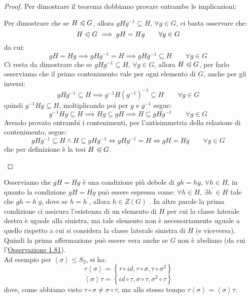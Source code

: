\documentclass[11pt]{scrartcl}
\begin{document}
\begin{proof}
Per dimostrare il teorema dobbiamo provare entrambe le implicazioni:
	\begin{enumerate}[(a)]
	\ii Per dimostrare che se $H \trianglelefteqslant G$, allora $gHg^{-1} \subseteq H$,  $\forall g \in G$, ci basta osservare che:
		\[ H \trianglelefteqslant G
		\implies
		gH=Hg
		\qquad
		\forall g \in G
		\]
da cui:
		\[ gH=Hg
		\implies
		gHg^{-1}=H
		\implies
		gHg^{-1} \subseteq H
		\qquad
		\forall g \in G
		\]
	\ii Ci resta da dimostrare che se $gHg^{-1} \subseteq H$, $\forall g \in G$, allora $H \trianglelefteqslant G$, per farlo osserviamo che il primo contenimento vale per ogni elemento di $G$, anche per gli inversi:
		\[ gHg^{-1} \subseteq H
		\implies
		g^{-1}H(g^{-1})^{-1} \subseteq H
		\qquad
		\forall g \in G
		\]
quindi $g^{-1}Hg \subseteq H$, moltiplicando poi per $g$ e $g^{-1}$ segue:
		\[ g^{-1}Hg  \subseteq H
		\implies
		Hg  \subseteq gH
		\implies
		H  \subseteq gHg^{-1}
		\qquad
		\forall g \in G
		\]
Avendo provato entrambi i contenimenti, per l'antisimmetria della relazione di contenimento, segue:
		\[ gHg^{-1} \subseteq H \land H  \subseteq gHg^{-1}
		\iff
		gHg^{-1} = H
		\iff
		gH=Hg
		\qquad
		\forall g \in G
		\]
che per definizione è la tesi $H \trianglelefteqslant G$.
	\end{enumerate}
\end{proof}

\begin{remark}
Osserviamo che $gH=Hg$ è una condizione più debole di $gh=hg$, $\forall h \in H$, in quanto la condizione $gH=Hg$ può essere espressa come: $\forall h \in H$, $\exists h^{\prime} \in H$ tale che $gh=h^{\prime}g$, dove se $h=h^{\prime}$, allora $h \in Z(G)$ . In altre parole la prima condizione ci assicura l'esistenza di un elemento di $H$ per cui la classe laterale destra è uguale alla sinistra, ma tale elemento non è necessariamente uguale a quello rispetto a cui si considera la classe laterale sinistra di $H$ (e viceversa). Quindi la prima affermazione può essere vera anche se $G$ non è abeliano (da cui l'\hyperref[g:ab]{Osservazione 1.81}). \\
Ad esempio per $\left<\sigma\right> \leqslant S_3$, si ha:
	\[ \tau \left<\sigma\right> = \left\{\tau \circ id, \tau \circ \sigma, \tau \circ \sigma^2\right\}
	\] \[ \left<\sigma\right> \tau = \left\{id \circ \tau, \sigma \circ \tau, \sigma^2 \circ \tau\right\}
	\]
dove, come abbiamo visto $\tau \circ \sigma \neq \sigma \circ \tau$, ma allo stesso tempo $\tau \left<\sigma\right> = \left<\sigma\right> \tau$.
\end{remark}
\end{document}

